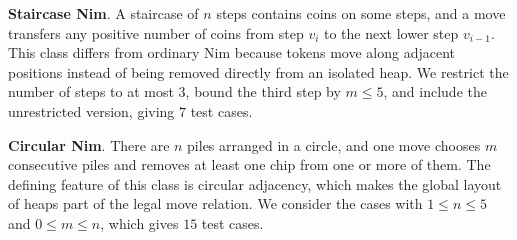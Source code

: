 \documentclass[review]{elsarticle}
\newcommand{\set}[1]{\{ #1 \}}
\newcommand{\tuple}[1]{\langle {#1} \rangle}
\newcommand{\true}{\top}
\newcommand{\statevar}{\mathcal{X}}
\newcommand{\act}{\mathcal{A}}
\newcommand{\constraint}{\mathcal{C}}
\newcommand{\estate}{\mathcal{E}}
\newcommand{\pre}{\mathtt{pre}}
\newcommand{\eff}{\mathtt{eff}}
\begin{document}
{\color{red}\textbf{Staircase Nim}. A staircase of $n$ steps contains coins on some steps, and a move transfers any positive number of coins from step $v_i$ to the next lower step $v_{i-1}$.}
{\color{red}This class differs from ordinary Nim because tokens move along adjacent positions instead of being removed directly from an isolated heap.}
{\color{red}We restrict the number of steps to at most $3$, bound the third step by $m \le 5$, and include the unrestricted version, giving $7$ test cases.}

{\color{red}\textbf{Circular Nim}. There are $n$ piles arranged in a circle, and one move chooses $m$ consecutive piles and removes at least one chip from one or more of them.}
{\color{red}The defining feature of this class is circular adjacency, which makes the global layout of heaps part of the legal move relation.}
{\color{red}We consider the cases with $1 \le n \le 5$ and $0 \le m \le n$, which gives $15$ test cases.}
\end{document}
